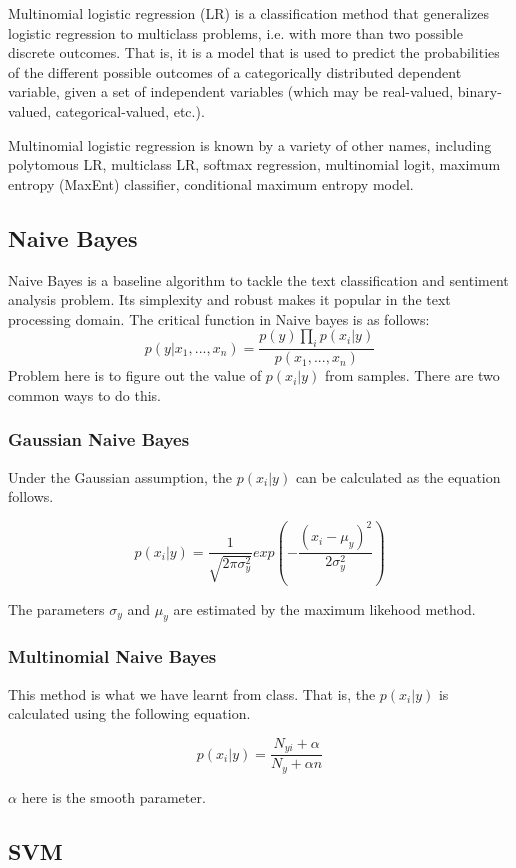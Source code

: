 \documentclass[letterpaper]{article} %
\begin{document}
Multinomial logistic regression (LR) is a classification method that generalizes logistic regression to multiclass problems, i.e. with more than two possible discrete outcomes. That is, it is a model that is used to predict the probabilities of the different possible outcomes of a categorically distributed dependent variable, given a set of independent variables (which may be real-valued, binary-valued, categorical-valued, etc.).

Multinomial logistic regression is known by a variety of other names, including polytomous LR, multiclass LR, softmax regression, multinomial logit, maximum entropy (MaxEnt) classifier, conditional maximum entropy model.

\subsection{Naive Bayes}

Naive Bayes is a baseline algorithm to tackle the text classification and sentiment analysis problem. Its simplexity and robust makes it popular in the text processing domain. The critical function in Naive bayes is as follows: \cite{pedregosa2011scikit}
$$p(y|x_1,...,x_n) = \frac{p(y)\prod_i p(x_i|y)}{p(x_1,...,x_n)}$$
Problem here is to figure out the value of $p(x_i|y)$ from samples. There are two common ways to do this.
\subsubsection{Gaussian Naive Bayes}

Under the Gaussian assumption, the $p(x_i|y)$ can be calculated as the equation follows.

$$p(x_i|y) = \frac{1}{\sqrt{2\pi \sigma_y^2}}exp(-\frac{(x_i-\mu_y)^2}{2\sigma_y^2})$$

The parameters $\sigma_y$ and $\mu_y$ are estimated by the maximum likehood method.

\subsubsection{Multinomial Naive Bayes}

This method is what we have learnt from class. That is, the $p(x_i|y)$ is calculated using the following equation.

$$p(x_i|y)=\frac{N_{yi}+\alpha}{N_y+\alpha n}$$

$\alpha$ here is the smooth parameter.

\subsection{SVM}
\end{document}
